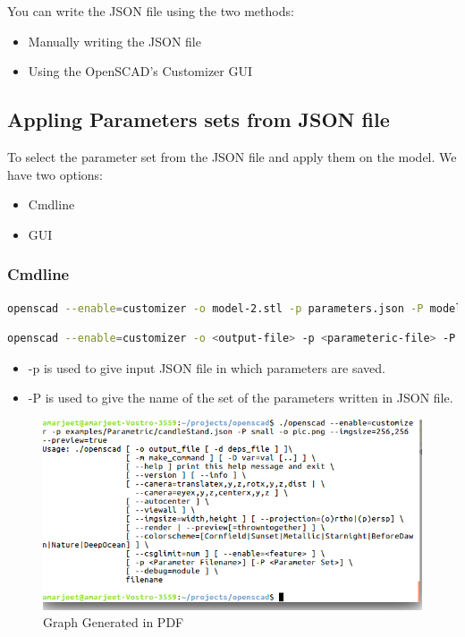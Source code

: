 You can write the JSON file using the two methods:
\begin{itemize}
    \item Manually writing the JSON file
    \item Using the OpenSCAD's Customizer GUI
\end{itemize}

\subsection{Appling Parameters sets from JSON file}
To select the parameter set from the JSON file and apply them on the model. We have two options:

\begin{itemize}
    \item Cmdline
    \item GUI
\end{itemize}

\subsubsection{Cmdline}
\begin{lstlisting}[language=bash]
openscad --enable=customizer -o model-2.stl -p parameters.json -P model-2 model.scad
\end{lstlisting}

\begin{lstlisting}[language=bash]
openscad --enable=customizer -o <output-file> -p <parameteric-file> -P <NameOfSet> <input-file SCAD file >\end{lstlisting}

\begin{itemize}
    \item -p is used to give input JSON file in which parameters are saved.
    \item -P is used to give the name of the set of the parameters written in JSON file.
\end{itemize}

\begin{figure}[H]
    \centering \includegraphics[scale=0.5]{images/output/8.png}
    \caption{Graph Generated in PDF}
    \label{fig:7}
\end{figure}

